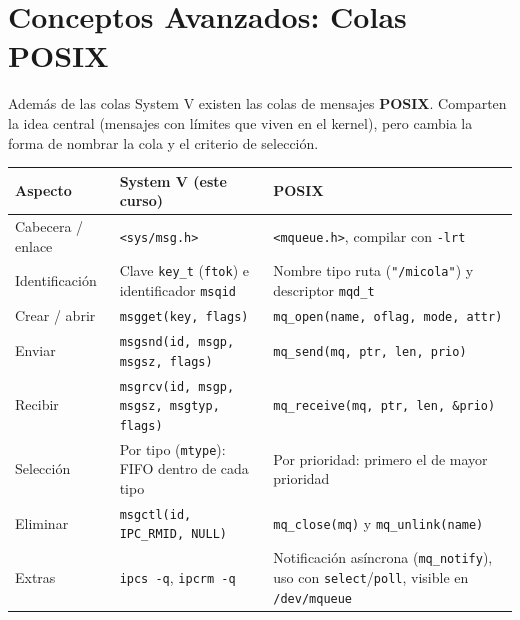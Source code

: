 \documentclass[12pt,a4paper]{article}
\begin{document}
\section{Conceptos Avanzados: Colas POSIX}
Además de las colas System V existen las colas de mensajes \textbf{POSIX}. Comparten la idea central (mensajes con límites que viven en el kernel), pero cambia la forma de nombrar la cola y el criterio de selección.

\begin{table}[h]
\centering
\footnotesize
\begin{tabular}{|l|p{5.2cm}|p{5.2cm}|}
\hline
\textbf{Aspecto} & \textbf{System V (este curso)} & \textbf{POSIX} \\ \hline
Cabecera / enlace & \texttt{<sys/msg.h>} & \texttt{<mqueue.h>}, compilar con \texttt{-lrt} \\ \hline
Identificación & Clave \texttt{key\_t} (\texttt{ftok}) e identificador \texttt{msqid} & Nombre tipo ruta (\texttt{"/micola"}) y descriptor \texttt{mqd\_t} \\ \hline
Crear / abrir & \texttt{msgget(key, flags)} & \texttt{mq\_open(name, oflag, mode, attr)} \\ \hline
Enviar & \texttt{msgsnd(id, msgp, msgsz, flags)} & \texttt{mq\_send(mq, ptr, len, prio)} \\ \hline
Recibir & \texttt{msgrcv(id, msgp, msgsz, msgtyp, flags)} & \texttt{mq\_receive(mq, ptr, len, \&prio)} \\ \hline
Selección & Por tipo (\texttt{mtype}): FIFO dentro de cada tipo & Por prioridad: primero el de mayor prioridad \\ \hline
Eliminar & \texttt{msgctl(id, IPC\_RMID, NULL)} & \texttt{mq\_close(mq)} y \texttt{mq\_unlink(name)} \\ \hline
Extras & \texttt{ipcs -q}, \texttt{ipcrm -q} & Notificación asíncrona (\texttt{mq\_notify}), uso con \texttt{select}/\texttt{poll}, visible en \texttt{/dev/mqueue} \\ \hline
\end{tabular}
\end{table}
\end{document}
